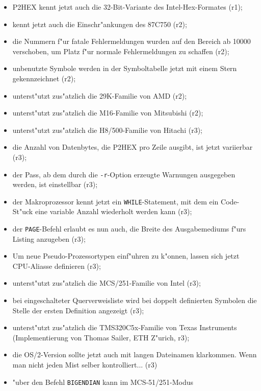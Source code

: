 \documentclass[12pt,a4paper,twoside]{report}
\newcommand{\tty}[1]{{\tt #1}}
\newcommand{\predefsym}[1]{{\tt (\_)#1}}
\begin{document}
\begin{itemize}
{\begin{itemize}
{            \predefsym{MOMCPUNAME}, der den Prozessornamen im Volltext enth"alt (r1).}
      \item{P2HEX kennt jetzt auch die 32-Bit-Variante des
            Intel-Hex-Formates (r1);}
      \item{kennt jetzt auch die Einschr"ankungen des 87C750 (r2);}
      \item{die Nummern f"ur fatale Fehlermeldungen wurden auf den Bereich
            ab 10000 verschoben, um Platz f"ur normale Fehlermeldungen zu
	    schaffen (r2);}
      \item{unbenutzte Symbole werden in der Symboltabelle jetzt mit einem
            Stern gekennzeichnet (r2);}
      \item{unterst"utzt zus"atzlich die 29K-Familie von AMD (r2);}
      \item{unterst"utzt zus"atzlich die M16-Familie von Mitsubishi (r2);}
      \item{unterst"utzt zus"atzlich die H8/500-Familie von Hitachi (r3);}
      \item{die Anzahl von Datenbytes, die P2HEX pro Zeile ausgibt, ist
            jetzt variierbar (r3);}
      \item{der Pass, ab dem durch die \tty{-r}-Option erzeugte Warnungen
            ausgegeben werden, ist einstellbar (r3);}
      \item{der Makroprozessor kennt jetzt ein \tty{WHILE}-Statement,
            mit dem ein Code-St"uck eine variable Anzahl wiederholt werden
	    kann (r3);}
      \item{der \tty{PAGE}-Befehl erlaubt es nun auch, die Breite des
            Ausgabemediums f"urs Listing anzugeben (r3);}
      \item{Um neue Pseudo-Prozessortypen einf"uhren zu k"onnen, lassen
            sich jetzt CPU-Aliasse definieren (r3);}
      \item{unterst"utzt zus"atzlich die MCS/251-Familie von Intel (r3);}
      \item{bei eingeschalteter Querverweisliste wird bei doppelt
            definierten Symbolen die Stelle der ersten Definition
	    angezeigt (r3);}
      \item{unterst"utzt zus"atzlich die TMS320C5x-Familie von Texas
            Instruments (Implementierung von Thomas Sailer, ETH Z"urich,
            r3);}
      \item{die OS/2-Version sollte jetzt auch mit langen Dateinamen
            klarkommen.  Wenn man nicht jeden Mist selber kontrolliert...
	    (r3)}
      \item{"uber den Befehl \tty{BIGENDIAN} kann im MCS-51/251-Modus
}
\end{itemize}}
\end{itemize}
\end{document}
